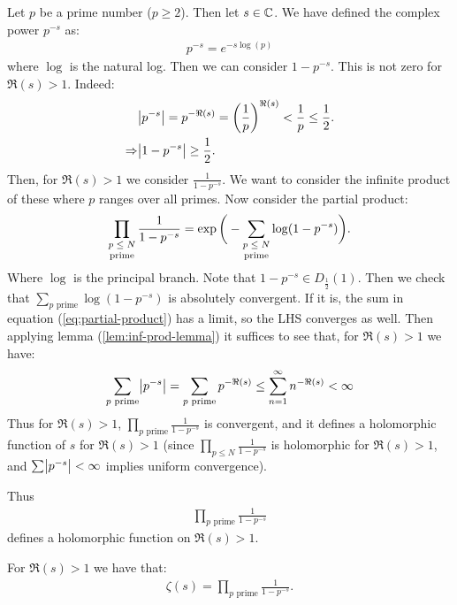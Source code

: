 Let $p$ be a prime number ($p \geq 2$). Then let $s \in \mathbb{C}$. We have defined the complex power $p^{-s}$ as:
\begin{align*}
    p^{-s} = e^{-s\log(p)}
\end{align*}
where $\log$ is the natural log. Then we can consider $1-p^{-s}$. This is not zero for $\Re(s) > 1$. Indeed:
\begin{align*}
    &\abs{p^{-s}} = p^{-\Re(s)} = \left( \frac{1}{p} \right)^{\Re(s)} < \frac{1}{p} \leq \frac{1}{2}.\\
    \Rightarrow &\abs{1-p^{-s}} \geq \frac{1}{2}.
\end{align*}
Then, for $\Re(s)>1$ we consider $\frac{1}{1-p^{-s}}$. We want to consider the infinite product of these where $p$ ranges over all primes. Now consider the partial product:
\begin{align}\label{eq:partial-product}
    \prod_{\text{\stackanchor{$p \leq N$}{prime}}} \frac{1}{1-p^{-s}} = \exp\bigg(-\sum_{\text{\stackanchor{$p \leq N$}{prime}}} \log(1-p^{-s}) \bigg).
\end{align}
Where $\log$ is the principal branch. Note that $1-p^{-s} \in D_{\frac{1}{2}}(1)$. Then we check that $\sum_{p \text{ prime}} \log(1-p^{-s})$ is absolutely convergent. If it is, the sum in equation (\ref{eq:partial-product}) has a limit, so the LHS converges as well. Then applying lemma (\ref{lem:inf-prod-lemma}) it suffices to see that, for $\Re(s) > 1$ we have:
\begin{align*}
    \sum_{p \text{ prime}}\abs{p^{-s}} = \sum_{p \text{ prime}} p^{-\Re(s)} \leq \sum_{n =1}^\infty n^{-\Re(s)} < \infty
\end{align*}
Thus for $\Re(s) > 1$, $\prod_{p \text{ prime}} \frac{1}{1-p^{-s}}$ is convergent, and it defines a holomorphic function of $s$ for $\Re(s) >1$ (since $\prod_{p \leq N} \frac{1}{1-p^{-s}}$ is holomorphic for $\Re(s) >1$, and $\sum\abs{p^{-s}} < \infty$ implies uniform convergence).

Thus
\begin{align*}
    \prod_{p \text{ prime}} \frac{1}{1-p^{-s}}
\end{align*}
defines a holomorphic function on $\Re(s) > 1$.

\begin{theorem}[Euler]\label{thm:r-euler-prod}
For $\Re(s)>1$ we have that:
\begin{align*}
    \zeta(s) = \prod_{p \text{ prime}} \frac{1}{1-p^{-s}}.
\end{align*}

\end{theorem}

